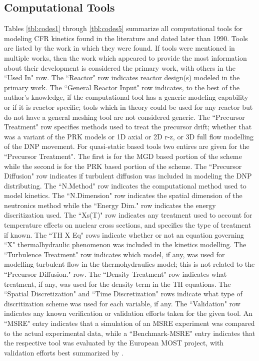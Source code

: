 \documentclass[review]{elsarticle}
\begin{document}
\begin{appendices}

\section{Computational Tools} \label{app:tools}
Tables \ref{tbl:codes1} through \ref{tbl:codes5}
 summarize all computational
tools for modeling CFR kinetics 
found in the literature and dated later than 1990. Tools are listed by the
work in which they were found. If tools were mentioned in multiple works, then
the work which appeared to provide the most information about their development
is considered
the primary work, with others in the ``Used In" row. The
``Reactor" row indicates reactor design(s) modeled in
the primary work. The ``General Reactor Input" row indicates, to the best
of the author's knowledge, if the computational tool has a generic modeling
capability or if it is reactor specific; tools which in theory could be used for
any reactor but do not have a general meshing tool are not considered generic.
The ``Precursor Treatment" row specifies methods used to
treat the precursor drift; whether that was a variant of the PRK models
or 1D axial or 2D r-z, or 3D full flow modelling of the DNP movement. For
quasi-static based tools two entires are given for the ``Precursor Treatment".
The first is for the MGD based portion of the scheme while the second is for the
PRK based portion of the scheme.
The ``Precursor Diffusion" row indicates if turbulent diffusion was included in
modeling the DNP distributing.
The ``N.Method" row indicates the computational method used to model
kinetics. The ``N.Dimension" row indicates the spatial dimension of 
the neutronics method while the ``Energy Dim." row indicates the energy
discritization used.
The ``Xs(T)" row indicates any treatment used to account for temperature
effects on nuclear cross sections, and specifies the type of treatment if known.
The ``TH X Eq" rows indicate whether or not an equation governing ``X" thermalhydraulic
phenomenon was
included in the kinetics modelling.
The ``Turbulence Treatment" row 
indicates which model, if any, was used for modelling turbulent flow in the
thermohydraulics model; this is not related to the ``Precursor Diffusion." row.
The ``Density Treatment" row indicates what treatment, if any, was used for the
density term in the TH equations. The ``Spatial Discretization" and ``Time
Discretization" rows indicate what type of discritization scheme was
used for each variable, if any. The ``Validation" row indicates any known
verification
or validation efforts taken for the given tool. An ``MSRE" entry indicates
that a simulation of an MSRE experiment was compared to the actual experimental
data, while a ``Benchmark-MSRE" entry indicates that the respective tool was
evaluated by the European MOST project, with validation efforts best
summarized by \cite{delpech_benchmark_2003}.


\end{appendices}
\end{document}
